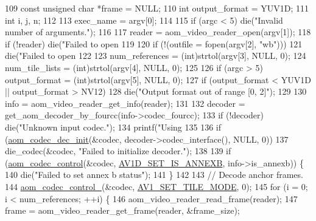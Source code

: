 \begin{DoxyCodeInclude}
{109   \textcolor{keyword}{const} \textcolor{keywordtype}{unsigned} \textcolor{keywordtype}{char} *frame = NULL;
110   \textcolor{keywordtype}{int} output\_format = YUV1D;
111   \textcolor{keywordtype}{int} i, j, n;
112 
113   exec\_name = argv[0];
114 
115   \textcolor{keywordflow}{if} (argc < 5) die(\textcolor{stringliteral}{"Invalid number of arguments."});
116 
117   reader = aom\_video\_reader\_open(argv[1]);
118   \textcolor{keywordflow}{if} (!reader) die(\textcolor{stringliteral}{"Failed to open %
119 
120   \textcolor{keywordflow}{if} (!(outfile = fopen(argv[2], \textcolor{stringliteral}{"wb"})))
121     die(\textcolor{stringliteral}{"Failed to open %
122 
123   num\_references = (int)strtol(argv[3], NULL, 0);
124   num\_tile\_lists = (int)strtol(argv[4], NULL, 0);
125 
126   \textcolor{keywordflow}{if} (argc > 5) output\_format = (int)strtol(argv[5], NULL, 0);
127   \textcolor{keywordflow}{if} (output\_format < YUV1D || output\_format > NV12)
128     die(\textcolor{stringliteral}{"Output format out of range [0, 2]"});
129 
130   info = aom\_video\_reader\_get\_info(reader);
131 
132   decoder = get\_aom\_decoder\_by\_fourcc(info->codec\_fourcc);
133   \textcolor{keywordflow}{if} (!decoder) die(\textcolor{stringliteral}{"Unknown input codec."});
134   printf(\textcolor{stringliteral}{"Using %
135 
136   \textcolor{keywordflow}{if} (\hyperlink{group__decoder_gafdbfca65b19ab1f6d72b32cd01753b9b}{aom\_codec\_dec\_init}(&codec, decoder->codec\_interface(), NULL, 0))
137     die\_codec(&codec, \textcolor{stringliteral}{"Failed to initialize decoder."});
138 
139   \textcolor{keywordflow}{if} (\hyperlink{group__codec_ga6da974f4eeaba1fa74106b28d0fe6ac5}{aom\_codec\_control}(&codec, \hyperlink{group__aom__decoder_gga3865fd4b3192489baa9a5c3632ebe97ba1fb269c5c5913d9995b6c35d28e2a788}{AV1D\_SET\_IS\_ANNEXB}, info->is\_annexb)) \{
140     die(\textcolor{stringliteral}{"Failed to set annex b status"});
141   \}
142 
143   \textcolor{comment}{// Decode anchor frames.}
144   \hyperlink{group__codec_ga51eb332a40dcacc39000ab8e0be36b79}{aom\_codec\_control\_}(&codec, \hyperlink{group__aom__decoder_gga3865fd4b3192489baa9a5c3632ebe97ba0795d8084ae8c78528c01587198df9e2}{AV1\_SET\_TILE\_MODE}, 0);
145   \textcolor{keywordflow}{for} (i = 0; i < num\_references; ++i) \{
146     aom\_video\_reader\_read\_frame(reader);
147     frame = aom\_video\_reader\_get\_frame(reader, &frame\_size);
}}}}
\end{DoxyCodeInclude}
